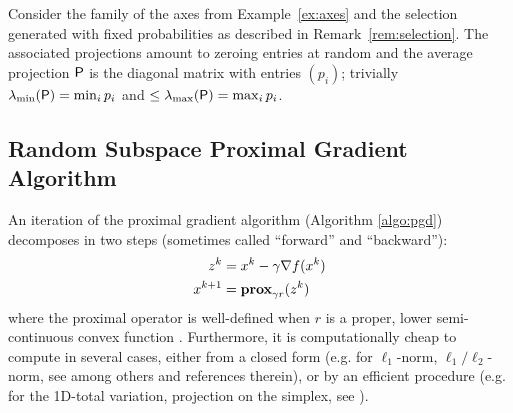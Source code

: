 {
\begin{example}\label{ex:P}
Consider the family of the axes from Example~\ref{ex:axes} and the selection generated with fixed probabilities as described in Remark~\ref{rem:selection}. The associated projections amount to zeroing entries at random and the average projection ${\mathsf{P}}$ is the diagonal matrix with entries $(p_i)$; trivially $\lambda_{\min}({\mathsf{P}})= \min_i p_i$ and $\leq \lambda_{\max}({\mathsf{P}}) = \max_i p_i$.
\end{example}}

\subsection{Random Subspace Proximal Gradient Algorithm} \label{sec:algo}

An iteration of the proximal gradient algorithm (Algorithm \ref{algo:pgd})
decomposes in two steps (sometimes called ``forward'' and  ``backward''):
\begin{subequations}\label{eq:pgGradProx}
    \begin{align}
    \label{eq:pgGrad} z^k &= x^{k} - \gamma \nabla f(x^k)\\
        \label{eq:pgProx} x^{k+1} &= \mathbf{prox}_{\gamma r}(z^k)
\end{align}
\end{subequations}
where the proximal operator is well-defined when $r$ is a proper, lower semi-continuous convex function \cite[Def.~12.23]{bauschke2011convex}. Furthermore, it is computationally cheap to compute in several cases, either from a closed form ({e.g.} for $\ell_1$-norm, $\ell_1/\ell_2$-norm, see among others \cite{combettes2008proximal} and references therein), or by an efficient procedure ({e.g.} for the 1D-total variation, projection on the simplex, see \cite{yuan2011efficient,condat2013direct}).


